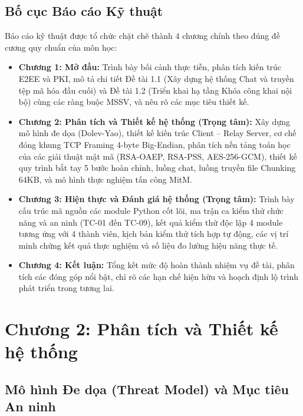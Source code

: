 \documentclass[a4paper,12pt]{article}
\begin{document}
\subsection{Bố cục Báo cáo Kỹ thuật}
Báo cáo kỹ thuật được tổ chức chặt chẽ thành 4 chương chính theo đúng đề cương quy chuẩn của môn học:
\begin{itemize}
    \item \textbf{Chương 1: Mở đầu:} Trình bày bối cảnh thực tiễn, phân tích kiến trúc E2EE và PKI, mô tả chi tiết Đề tài 1.1 (Xây dựng hệ thống Chat và truyền tệp mã hóa đầu cuối) và Đề tài 1.2 (Triển khai hạ tầng Khóa công khai nội bộ) cùng các ràng buộc MSSV, và nêu rõ các mục tiêu thiết kế.
    \item \textbf{Chương 2: Phân tích và Thiết kế hệ thống (Trọng tâm):} Xây dựng mô hình đe dọa (Dolev-Yao), thiết kế kiến trúc Client -- Relay Server, cơ chế đóng khung TCP Framing 4-byte Big-Endian, phân tích nền tảng toán học của các giải thuật mật mã (RSA-OAEP, RSA-PSS, AES-256-GCM), thiết kế quy trình bắt tay 5 bước hoàn chỉnh, luồng chat, luồng truyền file Chunking 64KB, và mô hình thực nghiệm tấn công MitM.
    \item \textbf{Chương 3: Hiện thực và Đánh giá hệ thống (Trọng tâm):} Trình bày cấu trúc mã nguồn các module Python cốt lõi, ma trận ca kiểm thử chức năng và an ninh (TC-01 đến TC-09), kết quả kiểm thử độc lập 4 module tương ứng với 4 thành viên, kịch bản kiểm thử tích hợp tự động, các vị trí minh chứng kết quả thực nghiệm và số liệu đo lường hiệu năng thực tế.
    \item \textbf{Chương 4: Kết luận:} Tổng kết mức độ hoàn thành nhiệm vụ đề tài, phân tích các đóng góp nổi bật, chỉ rõ các hạn chế hiện hữu và hoạch định lộ trình phát triển trong tương lai.
\end{itemize}

\section{Chương 2: Phân tích và Thiết kế hệ thống}

\subsection{Mô hình Đe dọa (Threat Model) và Mục tiêu An ninh}
\end{document}
